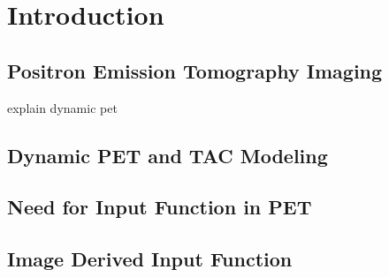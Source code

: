 \chapter{Introduction} 

\section{Positron Emission Tomography Imaging}
explain dynamic pet \cite{Faulkes2013}
\lipsum[1-1]
\section{Dynamic PET and TAC Modeling}
\lipsum[1-1]
\section{Need for Input Function in PET}
\lipsum[1-1]

\section{Image Derived Input Function}
\lipsum[1-1]

